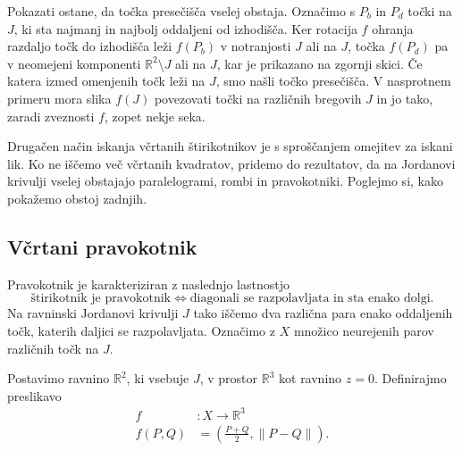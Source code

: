 \documentclass[mat1]{fmfdelo}
\newcommand{\R}{\mathbb R}
\begin{document}
Pokazati ostane, da točka presečišča vselej obstaja. Označimo s $P_b$ in $P_d$ točki na $J$, ki sta najmanj in najbolj oddaljeni od izhodišča. Ker rotacija $f$ ohranja razdaljo točk do izhodišča leži $f(P_b)$ v notranjosti $J$ ali na $J$, točka $f(P_d)$ pa v neomejeni komponenti $\R^2 \setminus J$ ali na $J$, kar je prikazano na zgornji skici. Če katera izmed omenjenih točk leži na $J$, smo našli točko presečišča. V nasprotnem primeru mora slika $f(J)$ povezovati točki na različnih bregovih $J$ in jo tako, zaradi zveznosti $f$, zopet nekje seka.
\endproof

Drugačen način iskanja včrtanih štirikotnikov je s sproščanjem omejitev za iskani lik. Ko ne iščemo več včrtanih kvadratov, pridemo do rezultatov, da na Jordanovi krivulji vselej obstajajo paralelogrami, rombi in pravokotniki. Poglejmo si, kako pokažemo obstoj zadnjih.

\subsection{Včrtani pravokotnik}
Pravokotnik je karakteriziran z naslednjo lastnostjo
\begin{equation}
\label{prop:pravokotnik}
\text{štirikotnik je pravokotnik} \iff \text{diagonali se razpolavljata in sta enako dolgi}.
\end{equation}
Na ravninski Jordanovi krivulji $J$ tako iščemo dva različna para enako oddaljenih točk, katerih daljici se razpolavljata. Označimo z $X$ množico neurejenih parov različnih točk na $J$.

Postavimo ravnino $\R^2$, ki vsebuje $J$, v prostor $\R^3$ kot ravnino $z = 0$. Definirajmo preslikavo 
\begin{align*}
f &\colon X \to \R^3 \\
f({P, Q}) &= ( \frac{P+Q}{2} , \|P-Q\|).
\end{align*}
\end{document}
